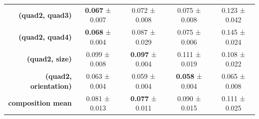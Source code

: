 \begin{tabular}{rcccc}
\textbf{(quad2, quad3)} & \textbf{0.067} ± 0.007 & 0.072 ± 0.008 & 0.075 ± 0.008 & 0.123 ± 0.042 \\
\textbf{(quad2, quad4)} & \textbf{0.068} ± 0.004 & 0.087 ± 0.029 & 0.075 ± 0.006 & 0.145 ± 0.024 \\
\textbf{(quad2, size)} & 0.099 ± 0.008 & \textbf{0.097} ± 0.004 & 0.111 ± 0.019 & 0.108 ± 0.022 \\
\textbf{(quad2, orientation)} & 0.063 ± 0.004 & 0.059 ± 0.004 & \textbf{0.058} ± 0.004 & 0.065 ± 0.008 \\
\addlinespace
\textbf{composition mean} & 0.081 ± 0.013 & \textbf{0.077} ± 0.011 & 0.090 ± 0.015 & 0.111 ± 0.025 \\
\midrule
\bottomrule
\end{tabular}
